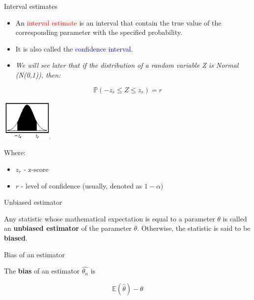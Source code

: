 \documentclass{beamer}
\begin{document}
\begin{frame}
{\centerline{Interval estimates}}

\begin{itemize}
\item An \textcolor{red}{interval estimate} is an interval that contain the true value of the corresponding parameter with the specified probability.
\item It is also called the \textcolor{blue}{confidence interval}.
\item \textit{We will see later that if the distribution of a random variable Z is Normal (N(0,1)), then:}
\end{itemize}

$$\mathbb{P} (-z_r\leq Z \leq z_r) = r$$

\begin{center}
\includegraphics[width=2.5cm]{A2022.IDSEPC.SperimentazioneDeduzione/conf-int-ex-1.png}
\end{center} 
Where:

\begin{itemize}
\item $z_r$ - z-score
\item $r$ - level of confidence (usually, denoted as $1-\alpha$)
\end{itemize}
\end{frame}


\begin{frame}
{\centerline{Unbiased estimator}}


Any statistic whose mathematical expectation is equal to a parameter $\theta$ is called an \textbf{unbiased estimator} of the parameter $\theta$. Otherwise, the statistic is said to be \textbf{biased}.

\end{frame}


\begin{frame}
{\centerline{Bias of an estimator}}


The \textbf{bias} of an estimator $\hat{\theta_n}$ is 

$$\mathbb{E}(\hat{\theta}) - \theta $$ 


\end{frame}
\end{document}
